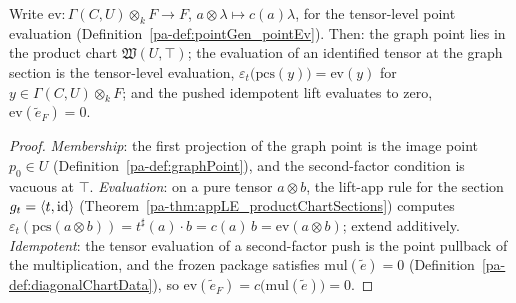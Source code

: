 \begin{lemma}
  \label{pa-lem:graphTensorEval}
  \leanok

  Write \(\mathrm{ev} \colon \Gamma(C,U) \otimes_k F \to F\),
  \(a \otimes \lambda \mapsto c(a)\lambda\), for the tensor-level point evaluation
  (Definition~\ref{pa-def:pointGen_pointEv}). Then:
  the graph point lies in the product chart \(\mathfrak W(U, \top)\);
  the evaluation of an identified tensor at the graph section is the tensor-level
  evaluation,
  \(\varepsilon_t\bigl(\mathrm{pcs}(y)\bigr) = \mathrm{ev}(y)\) for
  \(y \in \Gamma(C,U) \otimes_k F\); and the pushed idempotent lift evaluates to zero,
  \(\mathrm{ev}(\tilde e_F) = 0\).
\end{lemma}
\begin{proof}
  \leanok
  \emph{Membership}: the first projection of the graph point is the image point
  \(p_0 \in U\) (Definition~\ref{pa-def:graphPoint}), and the second-factor condition is
  vacuous at \(\top\). \emph{Evaluation}: on a pure tensor \(a \otimes b\), the lift-app
  rule for the section \(g_t = \langle t, \operatorname{id}\rangle\)
  (Theorem~\ref{pa-thm:appLE_productChartSections}) computes
  \(\varepsilon_t(\mathrm{pcs}(a \otimes b)) = t^{\sharp}(a) \cdot b = c(a)\,b =
  \mathrm{ev}(a \otimes b)\); extend additively. \emph{Idempotent}: the tensor evaluation
  of a second-factor push is the point pullback of the multiplication, and the frozen
  package satisfies \(\mathrm{mul}(\tilde e) = 0\)
  (Definition~\ref{pa-def:diagonalChartData}), so
  \(\mathrm{ev}(\tilde e_F) = c\bigl(\mathrm{mul}(\tilde e)\bigr) = 0\).
\end{proof}

